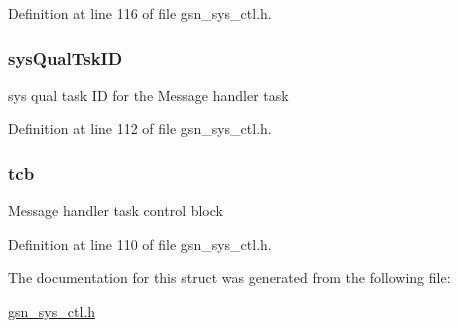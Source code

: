 Definition at line 116 of file gsn\_\-sys\_\-ctl.h.

\hypertarget{a00248_a3e06cb8fa58f49b7004a85c6f387ddc7}{
\subsubsection[{sysQualTskID}]{ {\bf sysQualTskID}}}
\label{a00248_a3e06cb8fa58f49b7004a85c6f387ddc7}
sys qual task ID for the Message handler task 

Definition at line 112 of file gsn\_\-sys\_\-ctl.h.

\hypertarget{a00248_afe071d7dcf0fdfb6314fefc4b6f663df}{
\subsubsection[{tcb}]{ {\bf tcb}}}
\label{a00248_afe071d7dcf0fdfb6314fefc4b6f663df}
Message handler task control block 

Definition at line 110 of file gsn\_\-sys\_\-ctl.h.



The documentation for this struct was generated from the following file:\begin{DoxyCompactItemize}
\item 
\hyperlink{a00592}{gsn\_\-sys\_\-ctl.h}\end{DoxyCompactItemize}
